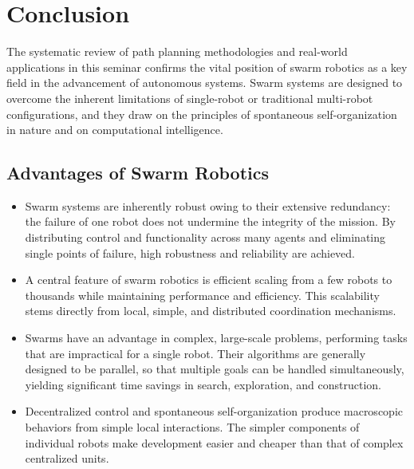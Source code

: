\section{Conclusion}\label{sec:conclusion}

The systematic review of path planning methodologies and real-world applications
in this seminar confirms the vital position of swarm robotics as a key field in
the advancement of autonomous systems. Swarm systems are designed to overcome the
inherent limitations of single-robot or traditional multi-robot configurations,
and they draw on the principles of spontaneous self-organization in nature and on
computational intelligence.

\subsection{Advantages of Swarm Robotics}

\begin{itemize}
  \item {} Swarm systems are inherently robust owing to their
        extensive redundancy: the failure of one robot does not undermine the
        integrity of the mission. By distributing control and functionality
        across many agents and eliminating single points of failure, high
        robustness and reliability are achieved.
  \item {} A central feature of swarm robotics is efficient
        scaling from a few robots to thousands while maintaining performance and
        efficiency. This scalability stems directly from local, simple, and
        distributed coordination mechanisms.
  \item {} Swarms have an advantage in complex,
        large-scale problems, performing tasks that are impractical for a single
        robot. Their algorithms are generally designed to be parallel, so that
        multiple goals can be handled simultaneously, yielding significant time
        savings in search, exploration, and construction.
  \item {} Decentralized control and
        spontaneous self-organization produce macroscopic behaviors from simple
        local interactions. The simpler components of individual robots make
        development easier and cheaper than that of complex centralized units.
\end{itemize}

